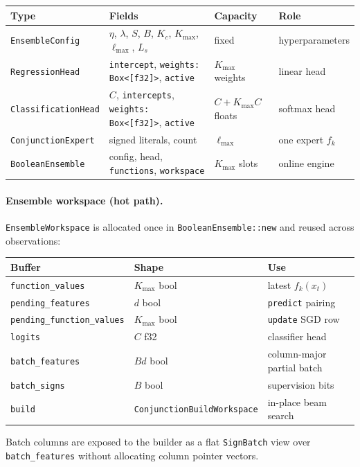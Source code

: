 \documentclass[11pt]{article}
\begin{document}
\begin{center}
\scriptsize
\setlength{\tabcolsep}{3pt}
\begin{tabular}{@{}p{}p{}p{}p{}@{}}
\hline
\textbf{Type} & \textbf{Fields} & \textbf{Capacity} & \textbf{Role} \\
\hline
\texttt{EnsembleConfig} & $\eta$, $\lambda$, $S$, $B$, $K_c$, $K_{\max}$, $\ell_{\max}$, $L_s$ & fixed & hyperparameters \\
\texttt{RegressionHead} & \texttt{intercept}, \texttt{weights: Box<[f32]>}, \texttt{active} & $K_{\max}$ weights & linear head \\
\texttt{ClassificationHead} & $C$, \texttt{intercepts}, \texttt{weights: Box<[f32]>}, \texttt{active} & $C{+}K_{\max}C$ floats & softmax head \\
\texttt{ConjunctionExpert} & signed literals, count & $\ell_{\max}$ & one expert $f_k$ \\
\texttt{BooleanEnsemble} & config, head, \texttt{functions}, \texttt{workspace} & $K_{\max}$ slots & online engine \\
\hline
\end{tabular}
\end{center}

\paragraph{Ensemble workspace (hot path).}
\texttt{EnsembleWorkspace} is allocated once in \texttt{BooleanEnsemble::new}
and reused across observations:
\begin{center}
\scriptsize
\setlength{\tabcolsep}{3pt}
\begin{tabular}{@{}p{}p{}p{}@{}}
\hline
\textbf{Buffer} & \textbf{Shape} & \textbf{Use} \\
\hline
\texttt{function\_values} & $K_{\max}$ bool & latest $f_k(x_t)$ \\
\texttt{pending\_features} & $d$ bool & \texttt{predict} pairing \\
\texttt{pending\_function\_values} & $K_{\max}$ bool & \texttt{update} SGD row \\
\texttt{logits} & $C$ f32 & classifier head \\
\texttt{batch\_features} & $Bd$ bool & column-major partial batch \\
\texttt{batch\_signs} & $B$ bool & supervision bits \\
\texttt{build} & \texttt{ConjunctionBuildWorkspace} & in-place beam search \\
\hline
\end{tabular}
\end{center}
Batch columns are exposed to the builder as a flat \texttt{SignBatch} view over
\texttt{batch\_features} without allocating column pointer vectors.
\end{document}
